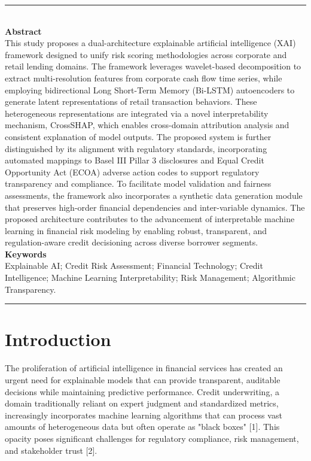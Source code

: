 \documentclass[a4 paper, 11pt,twoside]{article}
\newcommand{\0}{\Bf{0}}
\theoremstyle{definition}
\begin{document}
{\color{Brown}\rule{0.7\textwidth}{2pt}}\\[0.2cm]
{\color{Brown}\bf\large Abstract}\\
This study proposes a dual-architecture explainable artificial intelligence (XAI) framework designed to unify risk scoring methodologies across corporate and retail lending domains. The framework leverages wavelet-based decomposition to extract multi-resolution features from corporate cash flow time series, while employing bidirectional Long Short-Term Memory (Bi-LSTM) autoencoders to generate latent representations of retail transaction behaviors. These heterogeneous representations are integrated via a novel interpretability mechanism, CrossSHAP, which enables cross-domain attribution analysis and consistent explanation of model outputs. The proposed system is further distinguished by its alignment with regulatory standards, incorporating automated mappings to Basel III Pillar 3 disclosures and Equal Credit Opportunity Act (ECOA) adverse action codes to support regulatory transparency and compliance. To facilitate model validation and fairness assessments, the framework also incorporates a synthetic data generation module that preserves high-order financial dependencies and inter-variable dynamics. The proposed architecture contributes to the advancement of interpretable machine learning in financial risk modeling by enabling robust, transparent, and regulation-aware credit decisioning across diverse borrower segments.
\vspace{0.5cm}\\
{\color{Brown}\bf\large Keywords}\\
Explainable AI; Credit Risk Assessment; Financial Technology; Credit Intelligence; Machine Learning Interpretability; Risk Management; Algorithmic Transparency.
\vspace{0cm}\\
{\color{Brown}\rule{0.7\textwidth}{2pt}}
\section{Introduction}

The proliferation of artificial intelligence in financial services has created an urgent need for explainable models that can provide transparent, auditable decisions while maintaining predictive performance. Credit underwriting, a domain traditionally reliant on expert judgment and standardized metrics, increasingly incorporates machine learning algorithms that can process vast amounts of heterogeneous data but often operate as "black boxes" [1]. This opacity poses significant challenges for regulatory compliance, risk management, and stakeholder trust [2].
\end{document}
